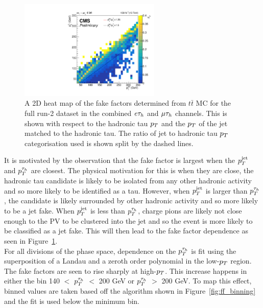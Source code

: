 \begin{figure}[!hbtp]
\centering
    \includegraphics[width=0.6\textwidth]{Figures/ff_colz_ttbar_lt.pdf}
\caption{A 2D heat map of the fake factors determined from $t\bar{t}$ MC for the full run-2 dataset in the combined $e\tau_{h}$ and $\mu\tau_{h}$ channels. This is shown with respect to the hadronic tau $p_{T}$ and the $p_{T}$ of the jet matched to the hadronic tau. The ratio of jet to hadronic tau $p_{T}$ categorisation used is shown split by the dashed lines.}
\label{fig:ff_colz}
\end{figure}

It is motivated by the observation that the fake factor is largest when the $p_{T}^{\text{jet}}$ and $p_{T}^{\tau_{h}}$ are closest.
The physical motivation for this is when they are close, the hadronic tau candidate is likely to be isolated from any other hadronic activity and so more likely to be identified as a tau.
However, when $p_{T}^{\text{jet}}$ is larger than $p_{T}^{\tau_{h}}$, the candidate is likely surrounded by other hadronic activity and so more likely to be a jet fake.
When $p_{T}^{\text{jet}}$ is less than $p_{T}^{\tau_{h}}$, charge pions are likely not close enough to the PV to be clustered into the jet and so the event is more likely to be classified as a jet fake. 
This will then lead to the fake factor dependence as seen in Figure~\ref{fig:ff_colz}.\\

For all divisions of the phase space, dependence on the $p_{T}^{\tau_{h}}$ is fit using the superposition of a Landau and a zeroth order polynomial in the low-$p_{T}$ region.
The fake factors are seen to rise sharply at high-$p_{T}$.
This increase happens in either the bin 140 $<$ $p_{T}^{\tau_{h}}$ $<$ 200 GeV or $p_{T}^{\tau_{h}}$ $>$ 200 GeV.
To map this effect, binned values are taken based off the algorithm shown in Figure~\ref{fig:ff_binning} and the fit is used below the minimum bin.

